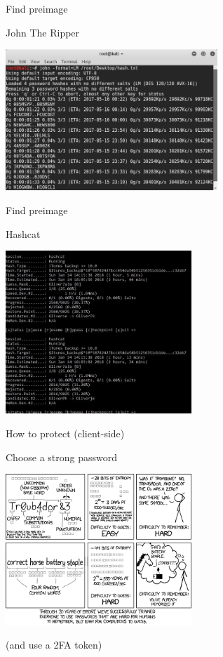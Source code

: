 \documentclass[handout, xcolor=dvipsnames,aspectratio=169]{beamer}
\begin{document}
\begin{frame}{Find preimage}

    John The Ripper
    
    \medskip
    
    \centering\includegraphics[width=8cm]{img/john}
    
\end{frame}
    
\begin{frame}{Find preimage}

    Hashcat
    
    \medskip
    
    \centering\includegraphics[width=7cm]{img/hashcat}
    
\end{frame}
    
\begin{frame}{How to protect (client-side)}

\centering

Choose a strong password

\includegraphics[width=7cm]{img/xkcd}

(and use a 2FA token)

\end{frame}
\end{document}
